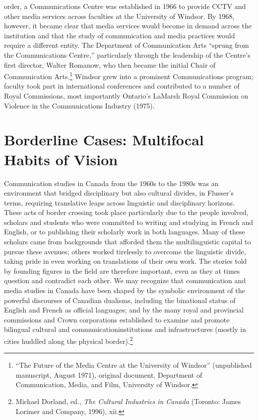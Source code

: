 \documentclass{tufte-handout}
\begin{document}
order, a Communications Centre was established in 1966 to provide CCTV
and other media services across faculties at the University of Windsor.
By 1968, however, it became clear that media services would become in
demand across the institution and that the study of communication and
media practices would require a different entity. The Department of
Communication Arts ``sprung from the Communications Centre,''
particularly through the leadership of the Centre's first director,
Walter Romanow, who then became the initial Chair of Communication
Arts.\footnote{``The Future of the Media Centre at the University of
  Windsor'' (unpublished manuscript, August 1971), original document,
  Department of Communication, Media, and Film, University of Windsor.}
Windsor grew into a prominent Communications program; faculty took part
in international conferences and contributed to a number of Royal
Commissions, most importantly Ontario's LaMarsh Royal Commission on
Violence in the Communications Industry (1975).



\hypertarget{borderline-cases-multifocal-habits-of-vision}{%
\section{Borderline Cases: Multifocal Habits of
Vision}\label{borderline-cases-multifocal-habits-of-vision}}

Communication studies in Canada from the 1960s to the 1980s was an
environment that bridged disciplinary but also cultural divides, in
Flusser's terms, requiring translative leaps across linguistic and
disciplinary horizons. These acts of border crossing took place
particularly due to the people involved, scholars and students who were
committed to writing and studying in French and English, or to
publishing their scholarly work in both languages. Many of these
scholars came from backgrounds that afforded them the multilinguistic
capital to pursue these avenues; others worked tirelessly to overcome
the linguistic divide, taking pride in even working on translations of
their own work. The stories told by founding figures in the field are
therefore important, even as they at times question and contradict each
other. We may recognize that communication and media studies in Canada
have been shaped by the symbolic environment of the powerful discourses
of Canadian dualisms, including the binational status of English and
French as official languages; and by the many royal and provincial
commissions and Crown corporations established to examine and promote
bilingual cultural and communication\newpage\noindent institutions and infrastructures
(mostly in cities huddled along the physical border).\footnote{Michael
  Dorland, ed., \emph{The Cultural Industries in Canada} (Toronto: James
  Lorimer and Company, 1996), xii.}
\end{document}

